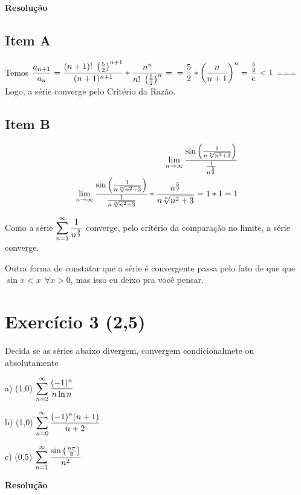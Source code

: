 \documentclass[12pt,openany, letterpaper]{book}
\newcommand{\LI}[1][n]{\lim_{{#1} \rightarrow \infty}}
\newcommand{\soma}[2][n]{\sum_{{#1} = #2}^\infty}
\newcommand{\E}[1]{Exercício #1}
\newcommand{\Resolve}{\begin{center} \textbf{Resolução} \end{center}}
\begin{document}
{{\Resolve

\begin{multicols}{2}
\subsection*{Item A}
Temos $\displaystyle{{a_{n+1} \over a_n} = {(n+1)!\ \left({5 \over 2}\right)^{n+1} \over (n+1)^{n+1}}*{n^n \over n! \ \left({5 \over 2}\right)^n}} = \\ = {5 \over 2}*\left({n \over n+1}\right)^n = {{5 \over 2} \over e} < 1$
===
Logo, a série converge pelo Critério da Razão.

\subsection*{Item B}
\begin{align*}
\LI {\sin{\left( {1 \over n \sqrt[n]{n^2 + 3}} \right)} \over {1 \over n^{5 \over 3}}} \\
\LI {\sin{\left( {1 \over n \sqrt[n]{n^2 + 3}} \right)} \over {1 \over n \sqrt[n]{n^2 + 3}}}*{n^{5 \over 3} \over n \sqrt[n]{n^2 + 3}} = 1*1 = 1 \\
\end{align*}

Como a série $\displaystyle{\soma{1} {1 \over n^{5 \over 3}}}$ converge, pelo critério da comparação no limite, a série converge.


Outra forma de constatar que a série  é convergente passa pelo fato de que que $\sin x < x \ \ \forall x > 0$, mas isso eu deixo pra você pensar.
\end{multicols}

\newpage

\section*{\E{3} (2,5)}{Decida se as séries abaixo divergem, convergem condicionalmete ou absolutamente}

\begin{multicols}{3}
a) (1,0) $\displaystyle{\soma{2} {(-1)^n \over n \ln{n}}}$

b) (1,0) $\displaystyle{\soma{0} {(-1)^n(n+1) \over n+2}}$

c) (0,5) $\displaystyle{\soma{1} {\sin\left({n\pi \over 2}\right) \over n^2}}$
\end{multicols}

\Resolve

\begin{multicols}{3}

\end{multicols}}}
\end{document}
